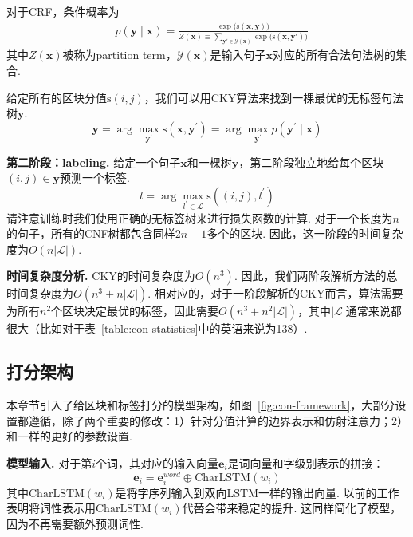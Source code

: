 对于CRF，条件概率为
\begin{equation}\label{eq:tree-prob}
  \begin{split}
    & p(\boldsymbol{y}\mid\boldsymbol{x})  = \frac{\exp({\mathrm{s}(\boldsymbol{x},\boldsymbol{y}))}}{Z(\boldsymbol{x}) \equiv \sum\limits_{\boldsymbol{y'} \in \mathcal{Y}(\boldsymbol{x})} {\exp({\mathrm{s}(\boldsymbol{x},\boldsymbol{y'}))}}}
  \end{split}
\end{equation}
其中$Z(\boldsymbol{x})$被称为partition term，$\mathcal{Y}(\boldsymbol{x})$是输入句子$\boldsymbol{x}$对应的所有合法句法树的集合.

给定所有的区块分值$\mathrm{s}(i,j)$，我们可以用CKY算法来找到一棵最优的无标签句法树$\boldsymbol{y}$.
\begin{equation} \label{eq:tree-argmax}
  \boldsymbol{y} = \arg\max_{\boldsymbol{y}^{\prime}} \mathrm{s}(\boldsymbol{x}, \boldsymbol{y}^{\prime}) = \arg\max_{\boldsymbol{y}^{\prime}} p(\boldsymbol{y}^{\prime} \mid \boldsymbol{x})
\end{equation}

\noindent\textbf{第二阶段：labeling.}
给定一个句子$\boldsymbol{x}$和一棵树$\boldsymbol{y}$，第二阶段独立地给每个区块$(i,j) \in \boldsymbol{y}$预测一个标签.
\begin{equation} \label{eq:label-argmax}
  l = \arg\max_{l^{\prime} \in \mathcal{L}} \mathrm{s}((i,j),l^{\prime})
\end{equation}
请注意训练时我们使用正确的无标签树来进行损失函数的计算.
对于一个长度为$n$的句子，所有的CNF树都包含同样$2n-1$多个的区块.
因此，这一阶段的时间复杂度为$O(n|\mathcal{L}|)$.

\noindent\textbf{时间复杂度分析.}
CKY的时间复杂度为$O(n^3)$.
因此，我们两阶段解析方法的总时间复杂度为$O(n^3+n|\mathcal{L}|)$.
相对应的，对于一阶段解析的CKY而言，算法需要为所有$n^2$个区块决定最优的标签，因此需要$O(n^3+n^2|\mathcal{L}|)$，其中$|\mathcal{L}|$通常来说都很大（比如对于表~\ref{table:con-statistics}中的英语来说为138）.

\subsection{打分架构}

本章节引入了给区块和标签打分的模型架构，如图~\ref{fig:con-framework}，大部分设置都遵循\citep{stern-etal-2017-minimal}，除了两个重要的修改：1）针对分值计算的边界表示和仿射注意力；2）和\citep{dozat-etal-2017-biaffine}一样的更好的参数设置.

\noindent\textbf{模型输入.}
对于第$i$个词，其对应的输入向量$\mathbf{e}_i$是词向量和字级别表示的拼接：
\begin{equation} \label{eq:token-representation}
  \mathbf{e}_i = \mathbf{e}^{word}_i \oplus \mathrm{CharLSTM}(w_i)
\end{equation}
其中$\mathrm{CharLSTM}(w_i)$是将字序列输入到双向LSTM一样的输出向量\citep{lample-etal-2016-neural}.
以前的工作表明将词性表示用$\mathrm{CharLSTM}(w_i)$代替会带来稳定的提升\citep{kitaev-klein-2018-constituency}.
这同样简化了模型，因为不再需要额外预测词性.

